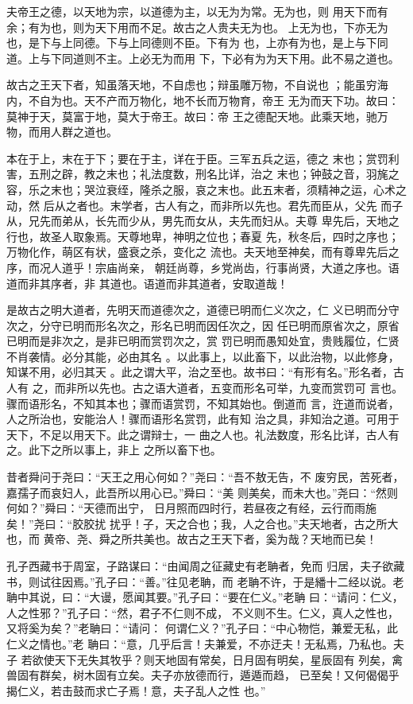 \documentclass[12pt,UTF8]{ctexbook}
\begin{document}
夫帝王之德，以天地为宗，以道德为主，以无为为常。无为也，则 用天下而有余；有为也，则为天下用而不足。故古之人贵夫无为也。 上无为也，下亦无为也，是下与上同德。下与上同德则不臣。下有为 也，上亦有为也，是上与下同道。上与下同道则不主。上必无为而用 下，下必有为为天下用。此不易之道也。

故古之王天下者，知虽落天地，不自虑也；辩虽雕万物，不自说也 ；能虽穷海内，不自为也。天不产而万物化，地不长而万物育，帝王 无为而天下功。故曰：莫神于天，莫富于地，莫大于帝王。故曰：帝 王之德配天地。此乘天地，驰万物，而用人群之道也。

本在于上，末在于下；要在于主，详在于臣。三军五兵之运，德之 末也；赏罚利害，五刑之辟，教之末也；礼法度数，刑名比详，治之 末也；钟鼓之音，羽旄之容，乐之末也；哭泣衰绖，隆杀之服，哀之末也。此五末者，须精神之运，心术之动，然 后从之者也。末学者，古人有之，而非所以先也。君先而臣从，父先 而子从，兄先而弟从，长先而少从，男先而女从，夫先而妇从。夫尊 卑先后，天地之行也，故圣人取象焉。天尊地卑，神明之位也；春夏 先，秋冬后，四时之序也；万物化作，萌区有状，盛衰之杀，变化之 流也。夫天地至神矣，而有尊卑先后之序，而况人道乎！宗庙尚亲， 朝廷尚尊，乡党尚齿，行事尚贤，大道之序也。语道而非其序者，非 其道也。语道而非其道者，安取道哉！

是故古之明大道者，先明天而道德次之，道德已明而仁义次之，仁 义已明而分守次之，分守已明而形名次之，形名已明而因任次之，因 任已明而原省次之，原省已明而是非次之，是非已明而赏罚次之，赏 罚已明而愚知处宜，贵贱履位，仁贤不肖袭情。必分其能，必由其名 。以此事上，以此畜下，以此治物，以此修身，知谋不用，必归其天 。此之谓大平，治之至也。故书曰：“有形有名。”形名者，古人有 之，而非所以先也。古之语大道者，五变而形名可举，九变而赏罚可 言也。骤而语形名，不知其本也；骤而语赏罚，不知其始也。倒道而 言，迕道而说者，人之所治也，安能治人！骤而语形名赏罚，此有知 治之具，非知治之道。可用于天下，不足以用天下。此之谓辩士，一 曲之人也。礼法数度，形名比详，古人有之。此下之所以事上，非上 之所以畜下也。

昔者舜问于尧曰：“天王之用心何如？”尧曰：“吾不敖无告，不 废穷民，苦死者，嘉孺子而哀妇人，此吾所以用心已。”舜曰：“美 则美矣，而未大也。”尧曰：“然则何如？”舜曰：“天德而出宁， 日月照而四时行，若昼夜之有经，云行而雨施矣！”尧曰：“胶胶扰 扰乎！子，天之合也；我，人之合也。”夫天地者，古之所大也，而 黄帝、尧、舜之所共美也。故古之王天下者，奚为哉？天地而已矣！

孔子西藏书于周室，子路谋曰：“由闻周之征藏史有老聃者，免而 归居，夫子欲藏书，则试往因焉。”孔子曰：“善。”往见老聃，而 老聃不许，于是繙十二经以说。老 聃中其说，曰：“大谩，愿闻其要。”孔子曰：“要在仁义。”老聃 曰：“请问：仁义，人之性邪？”孔子曰：“然，君子不仁则不成， 不义则不生。仁义，真人之性也，又将奚为矣？”老聃曰：“请问： 何谓仁义？”孔子曰：“中心物恺，兼爱无私，此仁义之情也。”老 聃曰：“意，几乎后言！夫兼爱，不亦迂夫！无私焉，乃私也。夫子 若欲使天下无失其牧乎？则天地固有常矣，日月固有明矣，星辰固有 列矣，禽兽固有群矣，树木固有立矣。夫子亦放德而行，遁遁而趋， 已至矣！又何偈偈乎揭仁义，若击鼓而求亡子焉！意，夫子乱人之性 也。”
\end{document}

